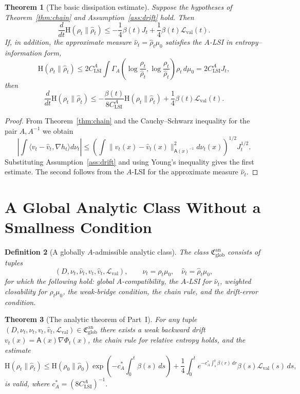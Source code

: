 \documentclass{article}
\newtheorem{theorem}{Theorem}[section]
\newtheorem{definition}[theorem]{Definition}
\newcommand{\Ent}{\mathrm H}
\newcommand{\Eval}{\mathcal L_{\mathrm{val}}}
\newcommand{\Asf}{\mathsf A}
\begin{document}
\begin{theorem}[The basic dissipation estimate]
\label{thm:basic-entropy}
Suppose the hypotheses of Theorem~\ref{thm:chain} and
Assumption~\ref{ass:drift} hold. Then
\[
        \frac{d}{dt}\Ent(\rho_t\|\hat\rho_t)
        \le
        -\frac14\beta(t)J_t+
        \frac14\beta(t)\Eval(t).
\]
If, in addition, the approximate measure \(\hat\nu_t=\hat\rho_t\mu_0\)
satisfies the \(A\)-LSI in entropy--information form,
\[
        \Ent(\rho_t\|\hat\rho_t)
        \le
        2C_{\mathrm{LSI}}^A
        \int\Gamma_A\left(\log\frac{\rho_t}{\hat\rho_t},
        \log\frac{\rho_t}{\hat\rho_t}\right)\rho_t\,d\mu_0
        =2C_{\mathrm{LSI}}^A J_t,
\]
then
\[
        \frac{d}{dt}\Ent(\rho_t\|\hat\rho_t)
        \le
        -\frac{\beta(t)}{8C_{\mathrm{LSI}}^A}
        \Ent(\rho_t\|\hat\rho_t)
        +\frac14\beta(t)\Eval(t).
\]
\end{theorem}

\begin{proof}
From Theorem~\ref{thm:chain} and the Cauchy--Schwarz inequality for the pair
\(A,A^{-1}\) we obtain
\[
        \left|\int\langle v_t-\hat v_t,\nabla h_t\rangle d\nu_t\right|
        \le
        \left(\int\|v_t(x)-\hat v_t(x)\|_{\Asf(x)^{-1}}^2d\nu_t(x)\right)^{1/2}
        J_t^{1/2}.
\]
Substituting Assumption~\ref{ass:drift} and using Young's inequality gives the
first estimate. The second follows from the \(A\)-LSI for the approximate
measure \(\hat\nu_t\).
\end{proof}

\section{A Global Analytic Class Without a Smallness Condition}

\begin{definition}[A globally \(A\)-admissible analytic class]
\label{def:glob-part1}
The class \(\mathfrak C_{\mathrm{glob}}^{\mathrm{an}}\) consists of tuples
\[
        (D,\nu_t,\hat\nu_t,v_t,\hat v_t,\Eval),
        \qquad \nu_t=\rho_t\mu_0,
        \quad \hat\nu_t=\hat\rho_t\mu_0,
\]
for which the following hold: global \(A\)-compatibility, the \(A\)-LSI for
\(\hat\nu_t\), weighted closability for \(\rho_t\mu_0\), the weak-bridge
condition, the chain rule, and the drift-error condition.
\end{definition}

\begin{theorem}[The analytic theorem of Part~I]
\label{thm:part1-main}
For any tuple \((D,\nu_t,\hat\nu_t,v_t,\hat v_t,\Eval)\in\mathfrak C_{\mathrm{glob}}^{\mathrm{an}}\)
there exists a weak backward drift \(v_t(x)=\Asf(x)\nabla\Phi_t(x)\), the chain
rule for relative entropy holds, and the estimate
\[
        \Ent(\rho_t\|\hat\rho_t)
        \le
        \Ent(\rho_0\|\hat\rho_0)
        \exp\left(-c_A^*\int_0^t\beta(s)\,ds\right)
        +\frac14\int_0^t e^{-c_A^*\int_s^t\beta(r)\,dr}\beta(s)\Eval(s)\,ds,
\]
is valid, where \(c_A^*=(8C_{\mathrm{LSI}}^A)^{-1}\).
\end{theorem}
\end{document}

